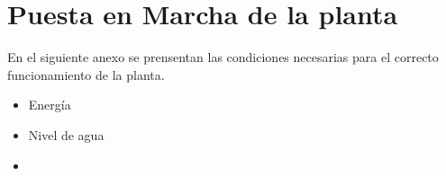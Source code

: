 \section{Puesta en Marcha de la planta}
\label{anexo:puestaEnMarcha}

En el siguiente anexo se prensentan las condiciones necesarias para el
correcto funcionamiento de la planta.

\begin{itemize}
 \item Energía
 \item Nivel de agua
 \item 
\end{itemize}
